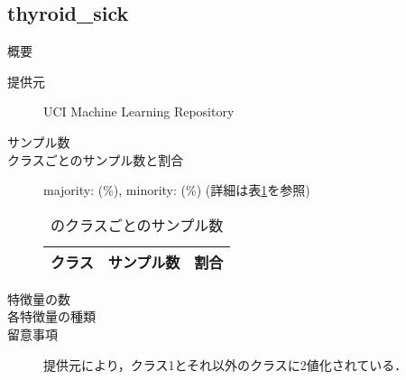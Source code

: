 \subsection{thyroid\_sick}
\begin{description}
    \item[概要] \cite{}
    \item[提供元] UCI Machine Learning Repository
    \item[サンプル数] 
    \item[クラスごとのサンプル数と割合] majority:  (\%), minority:  (\%) (詳細は表\ref{tab:}を参照)

        \begin{table}
            \centering
            \caption{のクラスごとのサンプル数}
            \label{tab:}
            \begin{tabular}{lrc} \hline
                \multicolumn{1}{c}{クラス}&
                \multicolumn{1}{c}{サンプル数}&
                \multicolumn{1}{c}{割合}\\
                \hline
                \hline

                \hline
            \end{tabular}
        \end{table}

    \item[特徴量の数] 
    \item[各特徴量の種類] \mbox{}
        
    \item[留意事項] 提供元により，クラス1とそれ以外のクラスに2値化されている．
\end{description}


